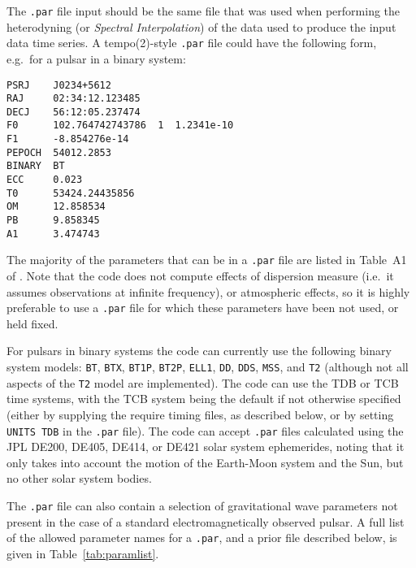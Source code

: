 The {\tt .par} file input should be the same file that was used when performing the heterodyning (or {\it Spectral Interpolation})
of the data used to produce the input data time series. A {\sc tempo(2)}-style {\tt .par} file could have the following form, e.g.\
for a pulsar in a binary system:
\begin{verbatim}
PSRJ    J0234+5612
RAJ     02:34:12.123485
DECJ    56:12:05.237474
F0      102.764742743786  1  1.2341e-10
F1      -8.854276e-14
PEPOCH  54012.2853
BINARY  BT
ECC     0.023
T0      53424.24435856
OM      12.858534
PB      9.858345
A1      3.474743
\end{verbatim}

The majority of the parameters that can be in a {\tt .par} file are listed in Table~A1 of \citep{2006MNRAS.372.1549E}.
Note that the code does not compute effects of dispersion measure (i.e.\ it assumes observations at infinite frequency),
or atmospheric effects, so it is highly preferable to use a {\tt .par} file for which these parameters have been not
used, or held fixed.

For pulsars in binary systems the code can currently use the following binary system models: {\tt BT}, {\tt BTX},
{\tt BT1P}, {\tt BT2P}, {\tt ELL1}, {\tt DD}, {\tt DDS}, {\tt MSS}, and {\tt T2} (although not all aspects of the
{\tt T2} model are implemented). The code can use the TDB or TCB time systems, with the TCB system being the default if not otherwise
specified (either by supplying the require timing files, as described below, or by setting {\tt UNITS TDB} in the {\tt .par} file).
The code can accept {\tt .par} files calculated using the JPL DE200, DE405, DE414, or DE421 solar system ephemerides, noting
that it only takes into account the motion of the Earth-Moon system and the Sun, but no other solar system bodies.

The {\tt .par} file can also contain a selection of gravitational wave parameters not present in the case of a standard
electromagnetically observed pulsar. A full list of the allowed parameter names for a {\tt .par}, and a prior file described below,
is given in Table~\ref{tab:paramlist}.

